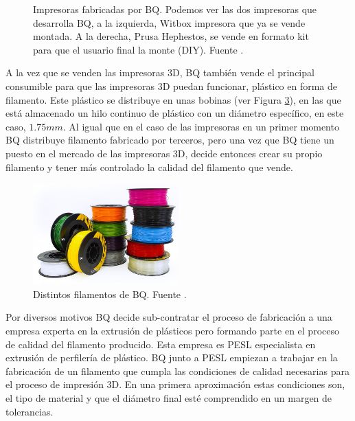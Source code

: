 \begin{figure}[!h]
\begin{subfigure}[b]{0.3\textwidth}
        \label{fig:estado_hephestos}
    \end{subfigure}
    \caption[Impresoras fabricadas por BQ.]{Impresoras fabricadas por BQ. Podemos ver las dos impresoras que desarrolla BQ, a la izquierda, Witbox impresora que ya se vende montada. A la derecha, Prusa Hephestos, se vende en formato kit para que el usuario final la monte (DIY). Fuente \cite{bq}.}
    \label{fig:impresoras_bq}
\end{figure}

A la vez que se venden las impresoras 3D, BQ también vende el principal consumible para que las impresoras 3D puedan funcionar, plástico en forma de filamento. Este plástico se distribuye en unas bobinas (ver Figura \ref{fig:estado_filamento}), en las que está almacenado un hilo continuo de plástico con un diámetro específico, en este caso, $1.75mm$. Al igual que en el caso de las impresoras en un primer momento BQ distribuye filamento fabricado por terceros, pero una vez que BQ tiene un puesto en el mercado de las impresoras 3D, decide entonces crear su propio filamento y tener más controlado la calidad del filamento que vende.

\begin{figure}[!ht]
    \centering
    \includegraphics[width=0.5\textwidth]{images/filamento_bq.png}
    \caption[Distintos filamentos de BQ.]{Distintos filamentos de BQ. Fuente \cite{bq}.}
    \label{fig:estado_filamento}
\end{figure}

Por diversos motivos BQ decide sub-contratar el proceso de fabricación a una empresa experta en la extrusión de plásticos pero formando parte en el proceso de calidad del filamento producido. Esta empresa es PESL especialista en extrusión de perfilería de plástico. BQ junto a PESL empiezan a trabajar en la fabricación de un filamento que cumpla las condiciones de calidad necesarias para el proceso de impresión 3D. En una primera aproximación estas condiciones son, el tipo de material y que el diámetro final esté comprendido en un margen de tolerancias.\\

